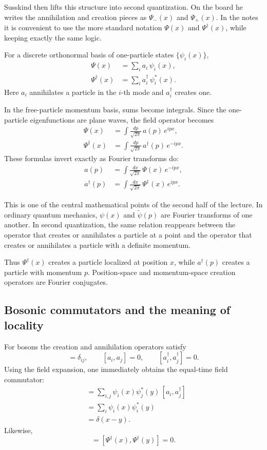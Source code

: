 Susskind then lifts this structure into second quantization. On the board he writes the annihilation and creation pieces as \(\Psi_-(x)\) and \(\Psi_+(x)\). In the notes it is convenient to use the more standard notation \(\Psi(x)\) and \(\Psi^\dagger(x)\), while keeping exactly the same logic.

For a discrete orthonormal basis of one-particle states \(\{\psi_i(x)\}\),
\begin{align}
\Psi(x) &= \sum_i a_i\,\psi_i(x),\\
\Psi^\dagger(x) &= \sum_i a_i^\dagger\,\psi_i^*(x).
\end{align}
Here \(a_i\) annihilates a particle in the \(i\)-th mode and \(a_i^\dagger\) creates one.

In the free-particle momentum basis, sums become integrals. Since the one-particle eigenfunctions are plane waves, the field operator becomes
\begin{align}
\Psi(x) &= \int \frac{dp}{\sqrt{2\pi}}\,a(p)\,e^{ipx},\\
\Psi^\dagger(x) &= \int \frac{dp}{\sqrt{2\pi}}\,a^\dagger(p)\,e^{-ipx}.
\end{align}
These formulas invert exactly as Fourier transforms do:
\begin{align}
a(p) &= \int \frac{dx}{\sqrt{2\pi}}\,\Psi(x)\,e^{-ipx},\\
a^\dagger(p) &= \int \frac{dx}{\sqrt{2\pi}}\,\Psi^\dagger(x)\,e^{ipx}.
\end{align}

This is one of the central mathematical points of the second half of the lecture. In ordinary quantum mechanics, \(\psi(x)\) and \(\tilde{\psi}(p)\) are Fourier transforms of one another. In second quantization, the same relation reappears between the operator that creates or annihilates a particle at a point and the operator that creates or annihilates a particle with a definite momentum.

Thus \(\Psi^\dagger(x)\) creates a particle localized at position \(x\), while \(a^\dagger(p)\) creates a particle with momentum \(p\). Position-space and momentum-space creation operators are Fourier conjugates.

\subsection{Bosonic commutators and the meaning of locality}

For bosons the creation and annihilation operators satisfy
\begin{equation}
[a_i,a_j^\dagger]=\delta_{ij},
\qquad
[a_i,a_j]=0,
\qquad
[a_i^\dagger,a_j^\dagger]=0.
\end{equation}
Using the field expansion, one immediately obtains the equal-time field commutator:
\begin{align}
[\Psi(x),\Psi^\dagger(y)]
&= \sum_{i,j}\psi_i(x)\psi_j^*(y)\,[a_i,a_j^\dagger] \\
&= \sum_i \psi_i(x)\psi_i^*(y) \\
&= \delta(x-y).
\end{align}
Likewise,
\begin{equation}
[\Psi(x),\Psi(y)]=[\Psi^\dagger(x),\Psi^\dagger(y)]=0.
\end{equation}


